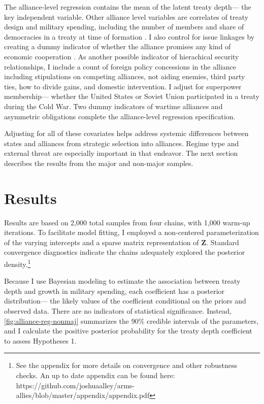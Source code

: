 \documentclass[12pt]{article}
\begin{document}
The alliance-level regression contains the mean of the latent treaty depth--- the key independent variable. 
Other alliance level variables are correlates of treaty design and military spending, including the number of members and share of democracies in a treaty at time of formation \citep{Chibaetal2015}. 
I also control for issue linkages by creating a dummy indicator of whether the alliance promises any kind of economic cooperation \citep{Poast2013, LongLeeds2006}. 
As another possible indicator of hierachical security relationships, I include a count of foreign policy concessions in the alliance including stipulations on competing alliances, not aiding enemies, third party ties, how to divide gains, and domestic intervention. 
I adjust for superpower membership--- whether the United States or Soviet Union participated in a treaty during the Cold War. 
Two dummy indicators of wartime alliances and asymmetric obligations \citep{Leedsetal2002} complete the alliance-level regression specification. 


Adjusting for all of these covariates helps address systemic differences between states and alliances from strategic selection into alliances. 
Regime type and external threat are especially important in that endeavor. 
The next section describes the results from the major and non-major samples.
 

\section{Results}


Results are based on 2,000 total samples from four chains, with 1,000 warm-up iterations. 
To facilitate model fitting, I employed a non-centered parameterization of the varying intercepts and a sparse matrix representation of \textbf{Z}. 
Standard convergence diagnostics indicate the chains adequately explored the posterior density.\footnote{See the appendix for more details on convergence and other robustness checks. An up to date appendix can be found here: https://github.com/joshuaalley/arms-allies/blob/master/appendix/appendix.pdf} 


Because I use Bayesian modeling to estimate the association between treaty depth and growth in military spending, each coefficient has a posterior distribution--- the likely values of the coefficient conditional on the priors and observed data.
There are no indicators of statistical significance. 
Instead, \autoref{fig:alliance-reg-nonmaj} summarizes the 90\% credible intervals of the parameters, and I calculate the positive posterior probability for the treaty depth coefficient to assess Hypotheses 1.
\end{document}
